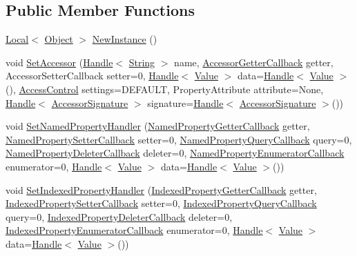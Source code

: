 \subsection*{Public Member Functions}
\begin{DoxyCompactItemize}
\item 
\hyperlink{classv8_1_1Local}{Local}$<$ \hyperlink{classv8_1_1Object}{Object} $>$ \hyperlink{classv8_1_1ObjectTemplate_ad25d8ebf37b1a3aaf7d4a03b1a9bd5c1}{New\-Instance} ()
\item 
void \hyperlink{classv8_1_1ObjectTemplate_acf245fcdedc797068a1eb4c8d46a5269}{Set\-Accessor} (\hyperlink{classv8_1_1Handle}{Handle}$<$ \hyperlink{classv8_1_1String}{String} $>$ name, \hyperlink{namespacev8_a2676a71943fdebd2e0a09fc256de6ff9}{Accessor\-Getter\-Callback} getter, Accessor\-Setter\-Callback setter=0, \hyperlink{classv8_1_1Handle}{Handle}$<$ \hyperlink{classv8_1_1Value}{Value} $>$ data=\hyperlink{classv8_1_1Handle}{Handle}$<$ \hyperlink{classv8_1_1Value}{Value} $>$(), \hyperlink{namespacev8_a31d8355cb043d7d2dda3f4a52760b64e}{Access\-Control} settings=D\-E\-F\-A\-U\-L\-T, Property\-Attribute attribute=None, \hyperlink{classv8_1_1Handle}{Handle}$<$ \hyperlink{classv8_1_1AccessorSignature}{Accessor\-Signature} $>$ signature=\hyperlink{classv8_1_1Handle}{Handle}$<$ \hyperlink{classv8_1_1AccessorSignature}{Accessor\-Signature} $>$())
\item 
void \hyperlink{classv8_1_1ObjectTemplate_ac7bcbb6e2936ab38490680f7e1bfb787}{Set\-Named\-Property\-Handler} (\hyperlink{namespacev8_a6989c9687ac7466f840e625f5492effd}{Named\-Property\-Getter\-Callback} getter, \hyperlink{namespacev8_acdec7bf35a4829e093c715f06abedb04}{Named\-Property\-Setter\-Callback} setter=0, \hyperlink{namespacev8_a4898f3b36dba46aa71ee27fdeaa97d23}{Named\-Property\-Query\-Callback} query=0, \hyperlink{namespacev8_a9936b2995e132587514c4ed68a6b75c9}{Named\-Property\-Deleter\-Callback} deleter=0, \hyperlink{namespacev8_a3e95283903632a838e4df2b4b915a545}{Named\-Property\-Enumerator\-Callback} enumerator=0, \hyperlink{classv8_1_1Handle}{Handle}$<$ \hyperlink{classv8_1_1Value}{Value} $>$ data=\hyperlink{classv8_1_1Handle}{Handle}$<$ \hyperlink{classv8_1_1Value}{Value} $>$())
\item 
void \hyperlink{classv8_1_1ObjectTemplate_a5542f9cf400563a8c2fda448144feee1}{Set\-Indexed\-Property\-Handler} (\hyperlink{namespacev8_a44546925ba002b2296a0ef25794003ef}{Indexed\-Property\-Getter\-Callback} getter, \hyperlink{namespacev8_a15b00cf8b0a84a46c7f3b3bc807fb901}{Indexed\-Property\-Setter\-Callback} setter=0, \hyperlink{namespacev8_af3c68ca291993f86484012c6789e2d6b}{Indexed\-Property\-Query\-Callback} query=0, \hyperlink{namespacev8_a7418cfa2330fbb54371d5cb883f4f974}{Indexed\-Property\-Deleter\-Callback} deleter=0, \hyperlink{namespacev8_aa8e207afeba7b651331fd3a11624630a}{Indexed\-Property\-Enumerator\-Callback} enumerator=0, \hyperlink{classv8_1_1Handle}{Handle}$<$ \hyperlink{classv8_1_1Value}{Value} $>$ data=\hyperlink{classv8_1_1Handle}{Handle}$<$ \hyperlink{classv8_1_1Value}{Value} $>$())

\end{DoxyCompactItemize}
